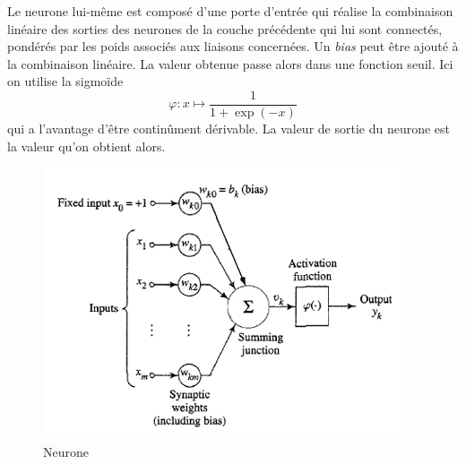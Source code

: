 \documentclass[a4paper,10pt]{article}
\begin{document}
Le neurone lui-même est composé d'une porte d'entrée qui réalise la combinaison linéaire des sorties des neurones de la couche
précédente qui lui sont connectés, pondérés par les poids associés aux liaisons concernées. Un \textit{bias} peut être ajouté
à la combinaison linéaire. La valeur obtenue
passe alors dans une fonction seuil. Ici on utilise la sigmoïde $$ \varphi : x \longmapsto \frac{1}{1+\exp(-x)}$$ qui a l'avantage
d'être continûment dérivable. La valeur de sortie du neurone est la valeur qu'on obtient alors.

\begin{figure}[H]
\centering
\includegraphics[scale = 0.6]{neuron}
\caption{Neurone}
 
\end{figure}
\end{document}
